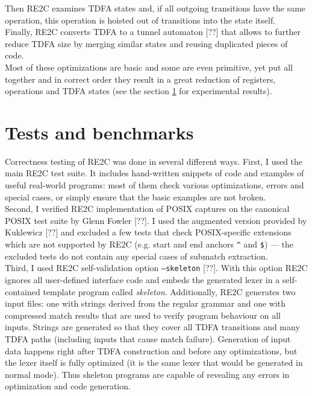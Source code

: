 \documentclass{article}
\theoremstyle{definition}
\begin{document}
\begin{multicols}{2}
Then RE2C examines TDFA states and, if all outgoing transitions have the same operation,
this operation is hoisted out of transitions into the state itself.
\\

Finally, RE2C converts TDFA to a tunnel automaton [??]
that allows to further reduce TDFA size by merging similar states and reusing duplicated pieces of code.
\\

Most of these optimizations are basic and some are even primitive, yet put all together and in correct order
they result in a great reduction of registers, operations and TDFA states
(see the section \ref{section_tests_and_benchmarks} for experimental results).

\section{Tests and benchmarks}\label{section_tests_and_benchmarks}

Correctness testing of RE2C was done in several different ways.
First, I used the main RE2C test suite. It includes hand-written snippets of code and examples of useful real-world programs:
most of them check various optimizations, errors and special cases,
or simply ensure that the basic examples are not broken.
\\

Second, I verified RE2C implementation of POSIX captures on the canonical POSIX test suite by Glenn Fowler [??].
I used the augmented version provided by Kuklewicz [??] and excluded a few tests that check POSIX-specific extensions
which are not supported by RE2C (e.g. start and end anchors \texttt{\^} and \texttt{\$}) ---
the excluded tests do not contain any special cases of submatch extraction.
\\

Third, I used RE2C self-validation option \texttt{--skeleton} [??].
With this option RE2C ignores all user-defined interface code
and embeds the generated lexer in a self-contained template program called \emph{skeleton}.
Additionally, RE2C generates two input files: one with strings derived from the regular grammar
and one with compressed match results that are used to verify program behaviour on all inputs.
Strings are generated so that they cover all TDFA transitions and many TDFA paths (including inputs that cause match failure).
Generation of input data happens right after TDFA construction and before any optimizations,
but the lexer itself is fully optimized (it is the same lexer that would be generated in normal mode).
Thus skeleton programs are capable of revealing any errors in optimization and code generation.
\\


\end{multicols}
\end{document}
